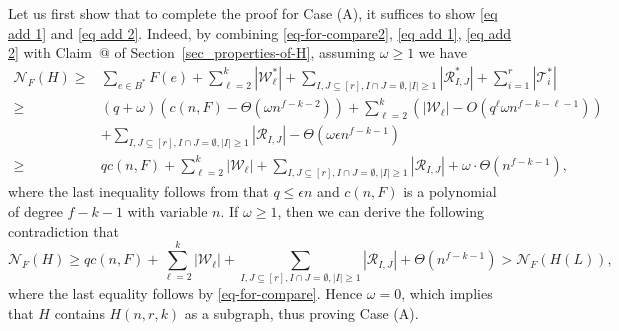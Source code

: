 \documentclass[10pt]{article}
\makeatletter
\newcommand*{\rom}[1]{\expandafter\@slowromancap\romannumeral #1@}
\makeatother
\begin{document}
Let us first show that to complete the proof for Case (A), it suffices to show \eqref{eq add 1} and \eqref{eq add 2}.
Indeed, by combining \eqref{eq-for-compare2}, \eqref{eq add 1}, \eqref{eq add 2} with Claim~\rom{3} of Section~\ref{sec_properties-of-H}, assuming $\omega\geq 1$ we have
\begin{align*}
\mathcal{N}_F(H)\geq & \sum_{e\in B^\ast}F(e)+ \sum_{\ell=2}^{k} |\mathcal{W}^\ast_\ell| +\sum_{I,J\subseteq [r],I\cap J=\emptyset, |I|\geq 1}|\mathcal{R}^\ast_{I,J}|+\sum_{i=1}^{r}|\mathcal{T}^\ast_i|\\
\geq &(q+\omega)\left(c(n,F)-\Theta (\omega n^{f-k-2})\right)+\sum_{\ell=2}^{k} \left(|\mathcal{W}_\ell|-O(q^\ell\omega n^{f-k-\ell-1})\right)\\
&+\sum_{I,J\subseteq [r],I\cap J=\emptyset, |I|\geq 1}|\mathcal{R}_{I,J}|-\Theta( \omega \epsilon n^{f-k-1})\\
\geq  & qc(n,F)+\sum_{\ell=2}^{k} |\mathcal{W}_\ell|+\sum_{I,J\subseteq [r],I\cap J=\emptyset, |I|\geq 1}|\mathcal{R}_{I,J}|+\omega\cdot \Theta(n^{f-k-1}),
\end{align*}
where the last inequality follows from that $q\leq \epsilon n$ and $c(n,F)$ is a polynomial of degree $f-k-1$ with variable $n$.
If $\omega\geq 1$, then we can derive the following contradiction that
$$\mathcal{N}_F(H)\geq qc(n,F)+\sum_{\ell=2}^{k} |\mathcal{W}_\ell|+\sum_{I,J\subseteq [r],I\cap J=\emptyset, |I|\geq 1}|\mathcal{R}_{I,J}|+ \Theta(n^{f-k-1})> \mathcal{N}_F(H(L)),$$
where the last equality follows by \eqref{eq-for-compare}.
Hence $\omega=0$, which implies that $H$ contains $H(n,r,k)$ as a subgraph, thus proving Case (A).
\end{document}
